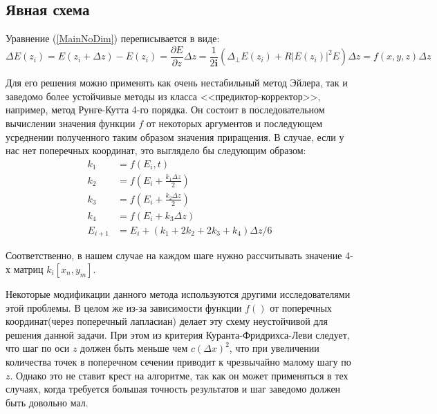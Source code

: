 \subsection{Явная схема}

Уравнение (\ref{MainNoDim}) переписывается в виде:
\begin{equation}
	\Delta E(z_i)=E(z_i+\Delta z)-E(z_i)=\frac{\partial E}{\partial z}\Delta z =
    \frac{1}{2\textbf{i}}(\Delta_{\perp}E(z_i) + R |E(z_i)|^2 E) \Delta z = f(x, y, z)\Delta z
\end{equation}

Для его решения можно применять как очень нестабильный метод Эйлера,
так и заведомо более устойчивые методы из класса <<предиктор-корректор>>,
например, метод Рунге-Кутта 4-го порядка. Он состоит в последовательном вычислении
значения функции $f$ от некоторых аргументов и последующем усреднении полученного
таким образом значения приращения.
В случае, если у нас нет поперечных координат, это выглядело бы следующим образом:
\begin{equation}\label{rk4_method}
    \begin{aligned}
        k_1 & = f(E_i,t) \\
        k_2 & = f(E_i + \frac{k_1 \Delta z}{2}) \\
        k_3 & = f(E_i + \frac{k_2 \Delta z}{2}) \\
        k_4 & = f(E_i + k_3 \Delta z) \\
        E_{i+1} & = E_i + (k_1 + 2 k_2 + 2 k_3 + k_4) \Delta z /6
    \end{aligned}
\end{equation}

Соответственно, в нашем случае на каждом шаге нужно рассчитывать значение 4-х матриц $k_i[x_n,y_m]$.

Некоторые модификации данного метода используются другими исследователями этой проблемы. В целом же из-за зависимости функции $f()$ от поперечных координат(через поперечный лапласиан) делает эту схему неустойчивой для решения данной задачи. При этом из критерия Куранта-Фридрихса-Леви следует, что шаг по оси $z$ должен быть меньше чем $c(\Delta x)^{2}$, что при увеличении количества точек в поперечном сечении приводит к чрезвычайно малому шагу по $z$.
Однако это не ставит крест на алгоритме, так как он может применяться в тех случаях, когда требуется большая точность результатов и шаг заведомо должен быть довольно мал. 